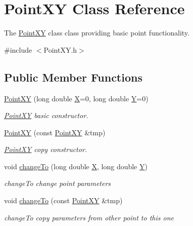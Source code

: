 \hypertarget{classPointXY}{}\section{Point\+X\+Y Class Reference}
\label{classPointXY}


The \hyperlink{classPointXY}{Point\+X\+Y} class class providing basic point functionality.  




{\ttfamily \#include $<$Point\+X\+Y.\+h$>$}

\subsection*{Public Member Functions}
\begin{DoxyCompactItemize}
\item 
\hyperlink{classPointXY_aab6d5e59dcd1183ce1fefb62a0620ed5}{Point\+X\+Y} (long double \hyperlink{classPointXY_a134e66580fce7d7c4c7f0a6fb80f3040}{X}=0, long double \hyperlink{classPointXY_a9e1a37c00a0fec942609fcd9185d1a10}{Y}=0)
\begin{DoxyCompactList}\small\item\em \hyperlink{classPointXY}{Point\+X\+Y} basic constructor. \end{DoxyCompactList}\item 
\hyperlink{classPointXY_a04df1b6e01e5521a7ad28aa8e5b3e830}{Point\+X\+Y} (const \hyperlink{classPointXY}{Point\+X\+Y} \&tmp)
\begin{DoxyCompactList}\small\item\em \hyperlink{classPointXY}{Point\+X\+Y} copy constructor. \end{DoxyCompactList}\item 
void \hyperlink{classPointXY_a696701ac3b43657e94284244f21f20f6}{change\+To} (long double \hyperlink{classPointXY_a134e66580fce7d7c4c7f0a6fb80f3040}{X}, long double \hyperlink{classPointXY_a9e1a37c00a0fec942609fcd9185d1a10}{Y})
\begin{DoxyCompactList}\small\item\em change\+To change point parameters \end{DoxyCompactList}\item 
void \hyperlink{classPointXY_a6bdc68a97ba4556cdefa9cff3f22089b}{change\+To} (const \hyperlink{classPointXY}{Point\+X\+Y} \&tmp)
\begin{DoxyCompactList}\small\item\em change\+To copy parameters from other point to this one \end{DoxyCompactList}\item 

\end{DoxyCompactItemize}
